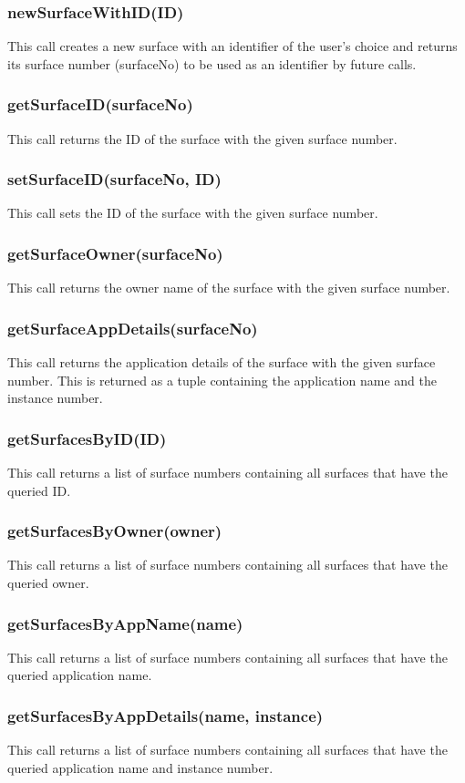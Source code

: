 \documentclass{acm_proc_article-sp}
\begin{document}
\subsubsection{newSurfaceWithID(ID)}
This call creates a new surface with an identifier of the user's choice and returns its surface number (surfaceNo) to be used as an identifier by future calls.
\subsubsection{getSurfaceID(surfaceNo)}
This call returns the ID of the surface with the given surface number.
\subsubsection{setSurfaceID(surfaceNo, ID)}
This call sets the ID of the surface with the given surface number.
\subsubsection{getSurfaceOwner(surfaceNo)}
This call returns the owner name of the surface with the given surface number.
\subsubsection{getSurfaceAppDetails(surfaceNo)}
This call returns the application details of the surface with the given surface number. This is returned as a tuple containing the application name and the instance number.
\subsubsection{getSurfacesByID(ID)}
This call returns a list of surface numbers containing all surfaces that have the queried ID.
\subsubsection{getSurfacesByOwner(owner)}
This call returns a list of surface numbers containing all surfaces that have the queried owner.
\subsubsection{getSurfacesByAppName(name)}
This call returns a list of surface numbers containing all surfaces that have the queried application name.
\subsubsection{getSurfacesByAppDetails(name, instance)}
This call returns a list of surface numbers containing all surfaces that have the queried application name and instance number.
\end{document}
